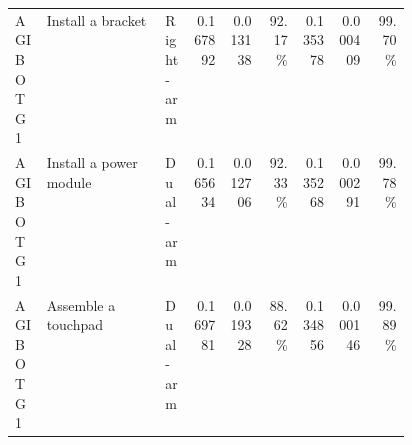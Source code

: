 \begin{landscape}
\begin{longtable}{@{}p{0.085\linewidth}p{0.300\linewidth}p{0.070\linewidth}rrrrrr@{}}
AGIBOT G1 & Install a bracket & Right-arm & 0.167892 & 0.013138 & 92.17\% & 0.135378 & 0.000409 & 99.70\% \\
AGIBOT G1 & Install a power module & Dual-arm & 0.165634 & 0.012706 & 92.33\% & 0.135268 & 0.000291 & 99.78\% \\
AGIBOT G1 & Assemble a touchpad & Dual-arm & 0.169781 & 0.019328 & 88.62\% & 0.134856 & 0.000146 & 99.89\% \\
\end{longtable}
\end{landscape}
\endgroup
